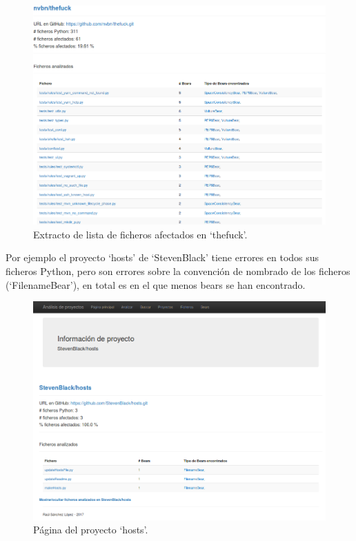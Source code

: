 \documentclass[a4paper, 12pt]{book}
\begin{document}
\begin{figure}[H]
  \centering
  \includegraphics[width=15cm, keepaspectratio]{img/theFuckInfo}
  \caption{Extracto de lista de ficheros afectados en `thefuck'.}
  \label{fig:theFuckInfo}
\end{figure}

Por ejemplo el proyecto `hosts' de `StevenBlack' tiene errores en todos sus ficheros Python, pero son errores sobre la convención de nombrado de los ficheros (`FilenameBear'), en total es en el que menos bears se han encontrado.

\begin{figure}[H]
  \centering
  \includegraphics[width=15cm, keepaspectratio]{img/proyectoHosts}
  \caption{Página del proyecto `hosts'.}
  \label{fig:proyectoHosts}
\end{figure}
\end{document}
